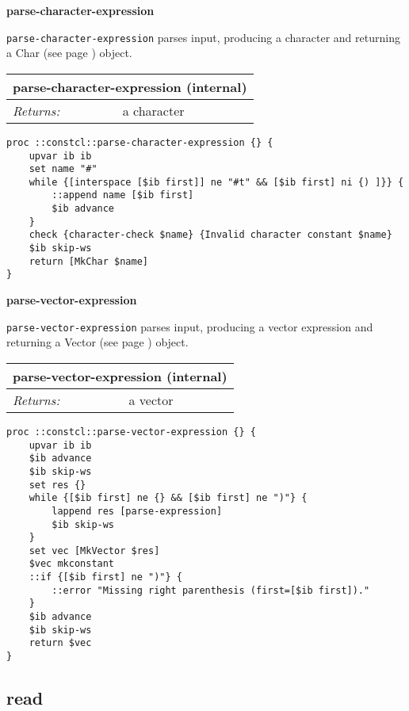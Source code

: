 \documentclass{report}
\begin{document}
\textbf{parse-character-expression}


\texttt{parse-character-expression} parses input, producing a character and returning a Char (see page \pageref{characters}) object.

\begin{tabular}{ |l l| }
\hline
\multicolumn{2}{|l|}{parse-character-expression (internal)} \\
\hline
\textit{Returns:} & a character \\
\hline
\end{tabular}

\noindent\makebox[\linewidth]{\rule{\linewidth}{0.4pt}}
\begin{lstlisting}
proc ::constcl::parse-character-expression {} {
    upvar ib ib
    set name "#"
    while {[interspace [$ib first]] ne "#t" && [$ib first] ni {) ]}} {
        ::append name [$ib first]
        $ib advance
    }
    check {character-check $name} {Invalid character constant $name}
    $ib skip-ws
    return [MkChar $name]
}
\end{lstlisting}
\noindent\makebox[\linewidth]{\rule{\linewidth}{0.4pt}}

\textbf{parse-vector-expression}


\texttt{parse-vector-expression} parses input, producing a vector expression and returning a Vector (see page \pageref{vectors}) object.

\begin{tabular}{ |l l| }
\hline
\multicolumn{2}{|l|}{parse-vector-expression (internal)} \\
\hline
\textit{Returns:} & a vector \\
\hline
\end{tabular}

\noindent\makebox[\linewidth]{\rule{\linewidth}{0.4pt}}
\begin{lstlisting}
proc ::constcl::parse-vector-expression {} {
    upvar ib ib
    $ib advance
    $ib skip-ws
    set res {}
    while {[$ib first] ne {} && [$ib first] ne ")"} {
        lappend res [parse-expression]
        $ib skip-ws
    }
    set vec [MkVector $res]
    $vec mkconstant
    ::if {[$ib first] ne ")"} {
        ::error "Missing right parenthesis (first=[$ib first])."
    }
    $ib advance
    $ib skip-ws
    return $vec
}
\end{lstlisting}
\noindent\makebox[\linewidth]{\rule{\linewidth}{0.4pt}}
\subsection{read}
\label{read1}
\end{document}
